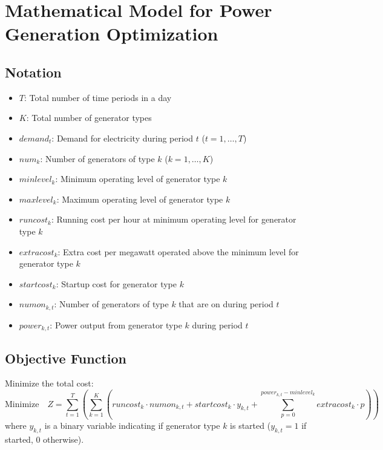 \documentclass{article}
\begin{document}
\section*{Mathematical Model for Power Generation Optimization}

\subsection*{Notation}
\begin{itemize}
    \item $T$: Total number of time periods in a day
    \item $K$: Total number of generator types
    \item $demand_t$: Demand for electricity during period $t$ ($t = 1, \ldots, T$)
    \item $num_k$: Number of generators of type $k$ ($k = 1, \ldots, K$)
    \item $minlevel_k$: Minimum operating level of generator type $k$
    \item $maxlevel_k$: Maximum operating level of generator type $k$
    \item $runcost_k$: Running cost per hour at minimum operating level for generator type $k$
    \item $extracost_k$: Extra cost per megawatt operated above the minimum level for generator type $k$
    \item $startcost_k$: Startup cost for generator type $k$
    \item $numon_{k,t}$: Number of generators of type $k$ that are on during period $t$
    \item $power_{k,t}$: Power output from generator type $k$ during period $t$
\end{itemize}

\subsection*{Objective Function}
Minimize the total cost:
\[
\text{Minimize} \quad Z = \sum_{t=1}^{T} \left( \sum_{k=1}^{K} \left( runcost_k \cdot numon_{k,t} + startcost_k \cdot y_{k,t} + \sum_{p=0}^{power_{k,t} - minlevel_k} extracost_k \cdot p \right) \right)
\]
where \( y_{k,t} \) is a binary variable indicating if generator type \( k \) is started ($y_{k,t} = 1$ if started, 0 otherwise).
\end{document}
